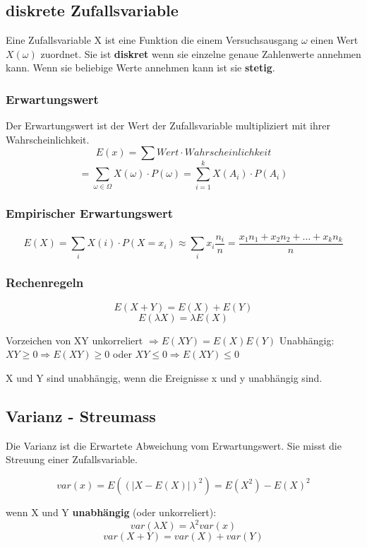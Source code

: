 \documentclass[margin=normal]{tex/hsrzf}
\begin{document}
\begin{multicols}{2}
    \subsection{diskrete Zufallsvariable}

    Eine Zufallsvariable X ist eine Funktion die einem
    Versuchsausgang $\omega$ einen Wert $X(\omega)$ zuordnet.
    Sie ist \textbf{diskret} wenn sie einzelne genaue Zahlenwerte annehmen kann.
    Wenn sie beliebige Werte annehmen kann ist sie \textbf{stetig}.

    \subsubsection*{Erwartungswert}
    Der Erwartungswert ist der Wert der Zufallsvariable multipliziert mit ihrer Wahrscheinlichkeit.
    $$E(x) = \sum Wert \cdot Wahrscheinlichkeit$$
    $$ =\sum _{\omega \in \Omega} X(\omega) \cdot P({\omega}) = \sum _{i=1} ^{k} X(A_i) \cdot P(A_i)$$
    \subsubsection*{Empirischer Erwartungswert}

    $$ E(X) = \sum _i X(i) \cdot P(X=x_i) \approx \sum _i x_i \frac{n_i}{n} = \frac{x_1n_1 + x_2n_2 + \dots + x_kn_k}{n}$$

    \subsubsection*{Rechenregeln}
    $$E(X+Y) = E(X) + E(Y)$$
    $$E(\lambda X) = \lambda E(X)$$

    Vorzeichen von XY unkorreliert $\Rightarrow E(XY) = E(X)E(Y)$
    Unabhängig: $XY \geq 0 \Rightarrow E(XY) \geq 0$ oder $XY\leq 0 \Rightarrow E(XY) \leq 0$

    X und Y sind unabhängig, wenn die Ereignisse x und y unabhängig sind.

    \subsection{Varianz - Streumass}
    Die Varianz ist die Erwartete Abweichung vom Erwartungswert.
    Sie misst die Streuung einer Zufallsvariable.

    $$var(x) = E((|X-E(X)|)^2) = E(X^2) - E(X)^2$$

    wenn X und Y \textbf{unabhängig} (oder unkorreliert):
    $$var(\lambda X) = \lambda^2 var(x)$$
    $$var(X+Y) = var(X) + var(Y)$$


\end{multicols}
\end{document}
